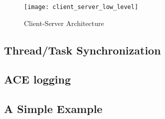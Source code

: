 \begin{figure}[!ht]
  \texttt{[image: client\_server\_low\_level]}
  \caption{Client-Server Architecture}
  \label{FIG_CLIENT_SERVER_ARCHITECTURE_LOW_LEVEL}
\end{figure}


\subsection{Thread/Task Synchronization}

\subsection{ACE logging}

\subsection{A Simple Example}



